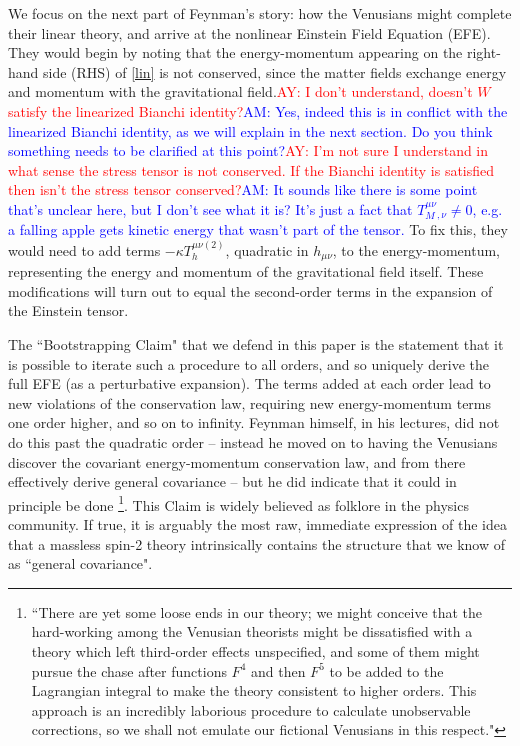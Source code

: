 \documentclass[aps,physrev,preprint,groupedaddress]{revtex4-2}
\newcommand{\AY}[1]{\textcolor{red}{AY: #1}}
\newcommand{\AM}[1]{\textcolor{blue}{AM: #1}}
\begin{document}
We focus on the next part of Feynman's story: how the Venusians might complete their linear theory, and arrive at the nonlinear Einstein Field Equation (EFE). They would begin by noting that the energy-momentum appearing on the right-hand side (RHS) of \eqref{lin} is not conserved, since the matter fields exchange energy and momentum with the gravitational field.\AY{I don't understand, doesn't $W$ satisfy the linearized Bianchi identity?}\AM{Yes, indeed this is in conflict with the linearized Bianchi identity, as we will explain in the next section. Do you think something needs to be clarified at this point?}\AY{I'm not sure I understand in what sense the stress tensor is not conserved. If the Bianchi identity is satisfied then isn't the stress tensor conserved?}\AM{It sounds like there is some point that's unclear here, but I don't see what it is? It's just a fact that $T_M^{\mu\nu}{}_{,\nu}\ne0$, e.g. a falling apple gets kinetic energy that wasn't part of the tensor.} To fix this, they would need to add terms \(- \kappa T_{h}^{\mu\nu(2)}\), quadratic in \(h_{\mu\nu}\), to the energy-momentum, representing the energy and momentum of the gravitational field itself. These modifications will turn out to equal the second-order terms in the expansion of the Einstein tensor. 


The ``Bootstrapping Claim" that we defend in this paper is the statement that it is possible to iterate such a procedure to all orders, and so uniquely derive the full EFE (as a perturbative expansion). The terms added at each order lead to new violations of the conservation law, requiring new energy-momentum terms one order higher, and so on to infinity. Feynman himself, in his lectures, did not do this past the quadratic order -- instead he moved on to having the Venusians discover the covariant energy-momentum conservation law, and from there effectively derive general covariance --
but he did indicate that it could in principle be done \footnote{``There are yet some loose ends in our theory; we might conceive that the hard-working among the Venusian theorists might be dissatisfied with a theory which left third-order effects unspecified, and some of them might pursue the chase after functions \(F^4\) and then \(F^5\) to be added to the Lagrangian integral to make the theory consistent to higher orders. This approach is an incredibly laborious procedure to calculate unobservable corrections, so we shall not emulate our fictional Venusians in this respect."\cite{Feynlectures}}. This Claim is widely believed as folklore in the physics community. If true, it is arguably the most raw, immediate expression of the idea that a massless spin-2 theory intrinsically contains the structure that we know of as ``general covariance".
\end{document}
